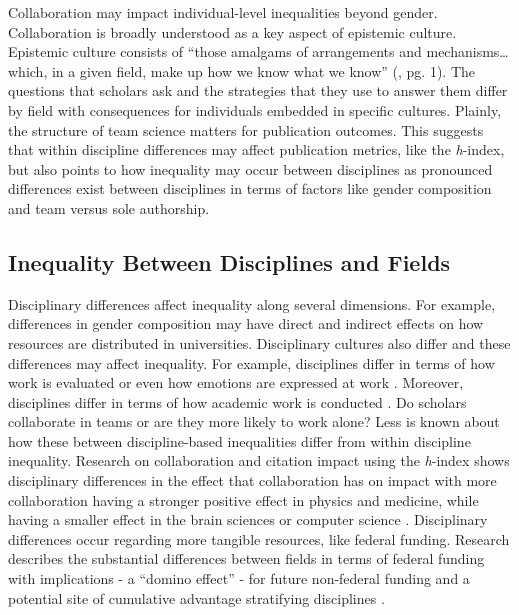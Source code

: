 \documentclass[
  10pt,
  letterpaper,
]{article}
\begin{document}
Collaboration may impact individual-level inequalities beyond gender.
Collaboration is broadly understood as a key aspect of epistemic
culture. Epistemic culture consists of ``those amalgams of arrangements
and mechanisms\ldots which, in a given field, make up how we know what
we know'' (\citep{cetina_epistemic_1999}, pg. 1). The questions that
scholars ask and the strategies that they use to answer them differ by
field with consequences for individuals embedded in specific cultures.
Plainly, the structure of team science matters for publication outcomes.
This suggests that within discipline differences may affect publication
metrics, like the \emph{h}-index, but also points to how inequality may
occur between disciplines as pronounced differences exist between
disciplines in terms of factors like gender composition and team versus
sole authorship.

\subsection{Inequality Between Disciplines and
Fields}\label{inequality-between-disciplines-and-fields}

Disciplinary differences affect inequality along several dimensions. For
example, differences in gender composition may have direct and indirect
effects on how resources are distributed in universities. Disciplinary
cultures also differ and these differences may affect inequality. For
example, disciplines differ in terms of how work is evaluated
\citep{lamont_how_2009} or even how emotions are expressed at work
\citep{koppman_joy_2015}. Moreover, disciplines differ in terms of how
academic work is conducted \citep{huang_historical_2020}. Do scholars
collaborate in teams or are they more likely to work alone? Less is
known about how these between discipline-based inequalities differ from
within discipline inequality. Research on collaboration and citation
impact using the \emph{h}-index shows disciplinary differences in the
effect that collaboration has on impact with more collaboration having a
stronger positive effect in physics and medicine, while having a smaller
effect in the brain sciences or computer science
\citep{parish_dynamics_2018}. Disciplinary differences occur regarding
more tangible resources, like federal funding. Research describes the
substantial differences between fields in terms of federal funding with
implications - a ``domino effect'' - for future non-federal funding and
a potential site of cumulative advantage stratifying disciplines
\citep{lanahan_domino_2016, lynn_15_2021}.
\end{document}
